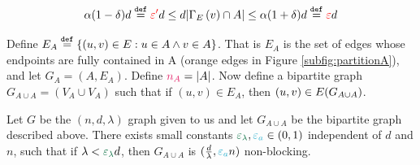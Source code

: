\documentclass[11pt]{article}
\newcommand{\EnDeeLambda}{(n, d, \lambda)}
\newcommand{\epsilonA}{\textcolor{ballblue}{\epsilon_a}}
\newcommand{\epsilonL}{\textcolor{cadmiumgreen}{\epsilon_\lambda}}
\newcommand{\na}{\textcolor{razzmatazz}{n_A}}
\newcommand{\BipartiteG}{G_{A \cup A}}
\newcommand{\EdgesShort}{E}
\begin{document}
\[\alpha(1-\delta) d  \Def \EpsLower d \leq d |\Neighbourhood{\EdgesShort}{v} \cap A| \leq \alpha(1+\delta)d \Def \Eps d \]

Define $E_A \text{}\overset{\mathtt{def}}{=} \{ (u,v) \in E : u \in A \land v \in A\}$. 
That is $E_A$ is the set of edges whose endpoints are fully contained in A (orange edges in Figure \ref{subfig:partitionA}), and let $G_A = (A, E_A)$. 
Define $ \na = |A|$.
Now define a bipartite graph $\BipartiteG = (V_A \cup V_A)$ such that if $(u,v) \in E_A$, then $(u,v) \in \Edges{\BipartiteG}$.

\begin{lemma}\label{lemma:bipartitie-is-non-blocking}Let $G$ be the $\EnDeeLambda$ graph given to us and let $\BipartiteG$ be the bipartite graph described above. 
There exists small constants $\epsilonL, \epsilonA  \in (0,1)$ independent of $d$ and $n$, such that if $\lambda < \epsilonL d$, then $\BipartiteG$ is $(\frac{d}{\lambda}, \epsilonA n)$ non-blocking.
\end{lemma}
\end{document}
